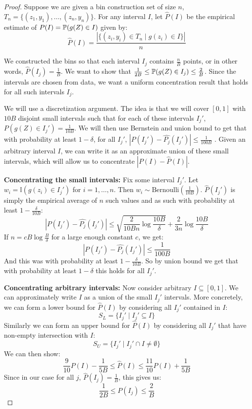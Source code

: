 \begin{proof}
Suppose we are given a bin construction set of size $n$, $T_n = \{(z_1, y_1), \dots, (z_n, y_n)\}$.
For any interval $I$, let $\hat{P}(I)$ be the empirical estimate of $P(I) = \mathbb{P}(g(Z) \in I)$ given by:
\[ \hat{P}(I) = \frac{|\{(z_i, y_i) \in T_n \mid g(z_i) \in I\}|}{n} \]

We constructed the bins so that each interval $I_j$ contains $\frac{n}{B}$ points, or in other words, $\hat{P}(I_j) = \frac{1}{B}$. We want to show that $\frac{1}{2B} \leq \mathbb{P}(g(Z) \in I_j) \leq \frac{2}{B}$. Since the intervals are chosen from data, we want a uniform concentration result that holds for all such intervals $I_j$.

We will use a discretization argument. The idea is that we will cover $[0, 1]$ with $10B$ disjoint small intervals such that for each of these intervals $I_j'$, $P(g(Z) \in I_j') = \frac{1}{10B}$. We will then use Bernstein and union bound to get that with probability at least $1 - \delta$, for all $I_j'$, $|P(I_j') - \hat{P_j}(I_j')| \leq \frac{1}{100B}$ . Given an arbitrary interval $I$, we can write it as an approximate union of these small intervals, which will allow us to concentrate $|P(I) - \hat{P}(I)|$.

\textbf{Concentrating the small intervals:} Fix some interval $I_j'$. Let $w_i = \mathbb{I}(g(z_i) \in I_j')$ for $i = 1,\dots,n$. Then $w_i \sim \mbox{Bernoulli}(\frac{1}{10B})$. $\hat{P}(I_j')$ is simply the empirical average of $n$ such values and as such with probability at least $1 - \frac{\delta}{10B}$:
\[ |P(I_j') - \hat{P_j}(I_j')| \leq \sqrt{\frac{2}{10Bn} \log{\frac{10B}{\delta}}} + \frac{2}{3n} \log{\frac{10B}{\delta}} \]
If $n = cB \log{\frac{B}{\delta}}$ for a large enough constant $c$, we get:
\[ |P(I_j') - \hat{P_j}(I_j')| \leq \frac{1}{100B} \]
And this was with probability at least $1 - \frac{\delta}{10B}$. So by union bound we get that with probability at least $1 - \delta$ this holds for all $I_j'$.

\textbf{Concentrating arbitrary intervals:} Now consider arbitrary $I \subseteq [0, 1]$. We can approximately write $I$ as a union of the small $I_j'$ intervals. More concretely, we can form a lower bound for $\hat{P}(I)$ by considering all $I_j'$ contained in $I$:
\[ S_L = \{I_j' \mid I_j' \subseteq I \} \]
Similarly we can form an upper bound for $\hat{P}(I)$ by considering all $I_j'$ that have non-empty intersection with $I$:
\[ S_U = \{I_j' \mid I_j' \cap I \neq \emptyset \} \]
We can then show:
\[  \frac{9}{10} P(I) - \frac{1}{5B} \leq \hat{P}(I) \leq \frac{11}{10} P(I) + \frac{1}{5B} \]
Since in our case for all $j$, $\hat{P}(I_j) = \frac{1}{B}$, this gives us:
\[ \frac{1}{2B} \leq P(I_j) \leq \frac{2}{B} \]
\end{proof}


